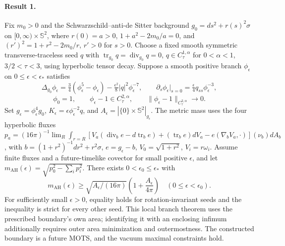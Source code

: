 \documentclass[11pt]{article}
\begin{document}
\paragraph{Result 1.} Fix $m_0>0$ and the Schwarzschild--anti-de Sitter background $g_0=ds^2+r(s)^2\sigma$ on $[0,\infty)\times\mathbb S^2$, where $r(0)=a>0$, $1+a^2-2m_0/a=0$, and $(r')^2=1+r^2-2m_0/r$, $r'>0$ for $s>0$. Choose a fixed smooth symmetric transverse-traceless seed $q$ with $\operatorname{tr}_{g_0}q=\operatorname{div}_{g_0}q=0$, $q\in C^{1,\alpha}_\tau$ for $0<\alpha<1$, $3/2<\tau<3$, using hyperbolic tensor decay. Suppose a smooth positive branch $\phi_\epsilon$ on $0\le\epsilon<\epsilon_*$ satisfies
\[
 \Delta_{g_0}\phi_\epsilon=\tfrac34(\phi_\epsilon^5-\phi_\epsilon)
 -\tfrac{\epsilon^2}8|q|^2\phi_\epsilon^{-7},\qquad
 \partial_s\phi_\epsilon|_{s=0}=\tfrac\epsilon4q_{ss}\phi_\epsilon^{-3},
\]
\[
 \phi_0=1,\qquad\phi_\epsilon-1\in C^{2,\alpha}_\tau,\qquad
 \|\phi_\epsilon-1\|_{C^{2,\alpha}_\tau}\to0.
\]
Set $g_\epsilon=\phi_\epsilon^4g_0$, $K_\epsilon=\epsilon\phi_\epsilon^{-2}q$, and $A_\epsilon=|\{0\}\times\mathbb S^2|_{g_\epsilon}$. The metric mass uses the four hyperbolic fluxes $p_a=(16\pi)^{-1}\lim_R\int_{r=R}[V_a(\operatorname{div}_be-d\operatorname{tr}_be)+(\operatorname{tr}_be)dV_a-e(\nabla_bV_a,\cdot)](\nu_b)dA_b$, with $b=(1+r^2)^{-1}dr^2+r^2\sigma$, $e=g_\epsilon-b$, $V_0=\sqrt{1+r^2}$, $V_i=r\omega_i$. Assume finite fluxes and a future-timelike covector for small positive $\epsilon$, and let $m_{\mathrm{AH}}(\epsilon)=\sqrt{p_0^2-\sum_ip_i^2}$. There exists $0<\epsilon_0\le\epsilon_*$ with
\[
 m_{\mathrm{AH}}(\epsilon)\ge\sqrt{A_\epsilon/(16\pi)}\left(1+\frac{A_\epsilon}{4\pi}\right)
 \quad(0\le\epsilon<\epsilon_0).
\]
For sufficiently small $\epsilon>0$, equality holds for rotation-invariant seeds and the inequality is strict for every other seed. This local branch theorem uses the prescribed boundary's own area; identifying it with an enclosing infimum additionally requires outer area minimization and outermostness. The constructed boundary is a future MOTS, and the vacuum maximal constraints hold.
\end{document}
